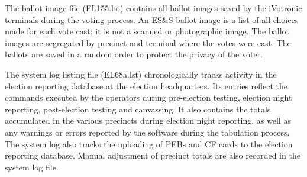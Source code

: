 The ballot image file (EL155.lst) contains all ballot images saved by
the iVotronic terminals during the voting process. An ES\&S ballot image
is a list of all choices made for each vote cast; it is not a scanned
or photographic image. The ballot images are segregated by precinct and
terminal where the votes were cast. The ballots are saved in a random
order to protect the privacy of the voter.  %
 
The system log listing file (EL68a.lst) chronologically tracks activity
in the election reporting database at the election headquarters. Its
entries reflect the commands executed by the operators during
pre-election testing, election night reporting, post-election testing
and canvassing. It also contains the totals accumulated in the various
precincts during election night reporting, as well as any warnings or
errors reported by the software during the tabulation process.
The system log also tracks the uploading of PEBs and CF cards to the
election reporting database. Manual adjustment of precinct totals are
also recorded in the system log file. %
